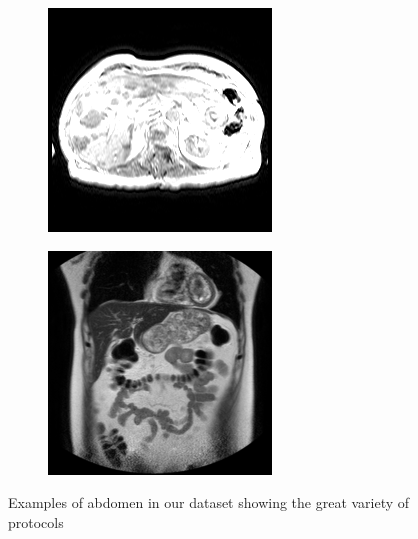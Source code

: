 \begin{figure}
\begin{subfigure}[b]{0.25\textwidth}
        \end{subfigure}%
        \begin{subfigure}[b]{0.25\textwidth}
                \centering
                \includegraphics[width=.95\linewidth]{img_hyperopt/abdo_3}
        \end{subfigure}%
        \begin{subfigure}[b]{0.25\textwidth}
                \centering
                \includegraphics[width=.95\linewidth]{img_hyperopt/abdo_4}
        \end{subfigure}
        \caption{Examples of abdomen in our dataset showing the great variety of protocols}
        \label{fig:abdomens}
\end{figure}

